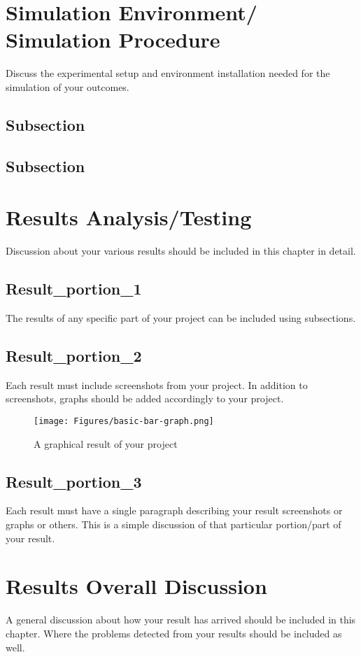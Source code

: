 \documentclass[12pt]{report}
\begin{document}
\section{Simulation Environment/ Simulation Procedure}
Discuss the experimental setup and environment installation needed for the simulation of your outcomes.

\subsection{Subsection}
\subsection{Subsection}

\section{Results Analysis/Testing}

Discussion about your various results should be included in this chapter in detail.
\subsection{Result\_portion\_1}
The results of any specific part of your project can be included using subsections.

\subsection{Result\_portion\_2}
Each result must include screenshots from your project. In addition to screenshots, graphs should be added accordingly to your project.

\begin{figure}[thbp]
        \begin{center}
         \texttt{[image: Figures/basic-bar-graph.png]}
        \end{center}
        \caption{A graphical result of your project}
     \end{figure}

\subsection{Result\_portion\_3}
Each result must have a single paragraph describing your result screenshots or graphs or others. This is a simple discussion of that particular portion/part of your result.

\section{Results Overall Discussion}
A general discussion about how your result has arrived should be included in this chapter. Where the problems detected from your results should be included as well.
\end{document}

